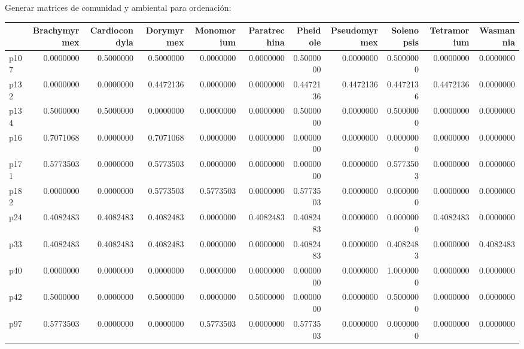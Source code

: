 \documentclass[11pt,]{article}
\newenvironment{Shaded}{\begin{snugshade}}{\end{snugshade}}
\newcommand{\KeywordTok}[1]{\textcolor[rgb]{0.13,0.29,0.53}{\textbf{#1}}}
\newcommand{\DataTypeTok}[1]{\textcolor[rgb]{0.13,0.29,0.53}{#1}}
\newcommand{\StringTok}[1]{\textcolor[rgb]{0.31,0.60,0.02}{#1}}
\newcommand{\OperatorTok}[1]{\textcolor[rgb]{0.81,0.36,0.00}{\textbf{#1}}}
\newcommand{\NormalTok}[1]{#1}
\begin{document}
Generar matrices de comunidad y ambiental para ordenación:

\begin{Shaded}
\end{Shaded}

\begin{longtable}[]{@{}lrrrrrrrrrr@{}}
\toprule
& Brachymyrmex & Cardiocondyla & Dorymyrmex & Monomorium & Paratrechina
& Pheidole & Pseudomyrmex & Solenopsis & Tetramorium &
Wasmannia\tabularnewline
\midrule
\endhead
p107 & 0.0000000 & 0.5000000 & 0.5000000 & 0.0000000 & 0.0000000 &
0.5000000 & 0.0000000 & 0.5000000 & 0.0000000 & 0.0000000\tabularnewline
p132 & 0.0000000 & 0.0000000 & 0.4472136 & 0.0000000 & 0.0000000 &
0.4472136 & 0.4472136 & 0.4472136 & 0.4472136 & 0.0000000\tabularnewline
p134 & 0.5000000 & 0.5000000 & 0.0000000 & 0.0000000 & 0.0000000 &
0.5000000 & 0.0000000 & 0.5000000 & 0.0000000 & 0.0000000\tabularnewline
p16 & 0.7071068 & 0.0000000 & 0.7071068 & 0.0000000 & 0.0000000 &
0.0000000 & 0.0000000 & 0.0000000 & 0.0000000 & 0.0000000\tabularnewline
p171 & 0.5773503 & 0.0000000 & 0.5773503 & 0.0000000 & 0.0000000 &
0.0000000 & 0.0000000 & 0.5773503 & 0.0000000 & 0.0000000\tabularnewline
p182 & 0.0000000 & 0.0000000 & 0.5773503 & 0.5773503 & 0.0000000 &
0.5773503 & 0.0000000 & 0.0000000 & 0.0000000 & 0.0000000\tabularnewline
p24 & 0.4082483 & 0.4082483 & 0.4082483 & 0.0000000 & 0.4082483 &
0.4082483 & 0.0000000 & 0.0000000 & 0.4082483 & 0.0000000\tabularnewline
p33 & 0.4082483 & 0.4082483 & 0.4082483 & 0.0000000 & 0.0000000 &
0.4082483 & 0.0000000 & 0.4082483 & 0.0000000 & 0.4082483\tabularnewline
p40 & 0.0000000 & 0.0000000 & 0.0000000 & 0.0000000 & 0.0000000 &
0.0000000 & 0.0000000 & 1.0000000 & 0.0000000 & 0.0000000\tabularnewline
p42 & 0.5000000 & 0.0000000 & 0.5000000 & 0.0000000 & 0.5000000 &
0.0000000 & 0.0000000 & 0.5000000 & 0.0000000 & 0.0000000\tabularnewline
p97 & 0.5773503 & 0.0000000 & 0.0000000 & 0.5773503 & 0.0000000 &
0.5773503 & 0.0000000 & 0.0000000 & 0.0000000 & 0.0000000\tabularnewline
\bottomrule
\end{longtable}

\begin{Shaded}
\end{Shaded}
\end{document}
